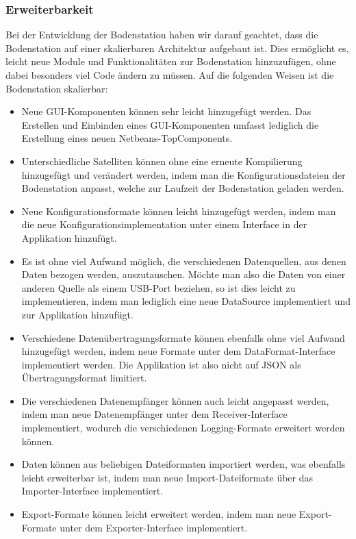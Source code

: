 \subsubsection{Erweiterbarkeit}
Bei der Entwicklung der Bodenstation haben wir darauf geachtet, dass die Bodenstation auf einer skalierbaren Architektur aufgebaut ist. Dies ermöglicht es, leicht neue Module und Funktionalitäten zur Bodenstation hinzuzufügen, ohne dabei besonders viel Code ändern zu müssen. Auf die folgenden Weisen ist die Bodenstation skalierbar:
\begin{itemize}
	\item Neue GUI-Komponenten können sehr leicht hinzugefügt werden. Das Erstellen und Einbinden eines GUI-Komponenten umfasst lediglich die Erstellung eines neuen Netbeans-TopComponents.
	\item Unterschiedliche Satelliten können ohne eine erneute Kompilierung hinzugefügt und verändert werden, indem man die Konfigurationsdateien der Bodenstation anpasst, welche zur Laufzeit der Bodenstation geladen werden.
	\item Neue Konfigurationsformate können leicht hinzugefügt werden, indem man die neue Konfigurationsimplementation unter einem Interface in der Applikation hinzufügt.
	\item Es ist ohne viel Aufwand möglich, die verschiedenen Datenquellen, aus denen Daten bezogen werden, auszutauschen. Möchte man also die Daten von einer anderen Quelle als einem USB-Port beziehen, so ist dies leicht zu implementieren, indem man lediglich eine neue DataSource implementiert und zur Applikation hinzufügt.
	\item Verschiedene Datenübertragungsformate können ebenfalls ohne viel Aufwand hinzugefügt werden, indem neue Formate unter dem DataFormat-Interface implementiert werden. Die Applikation ist also nicht auf JSON als Übertragungsformat limitiert.
	\item Die verschiedenen Datenempfänger können auch leicht angepasst werden, indem man neue Datenempfänger unter dem Receiver-Interface implementiert, wodurch die verschiedenen Logging-Formate erweitert werden können.
	\item Daten können aus beliebigen Dateiformaten importiert werden, was ebenfalls leicht erweiterbar ist, indem man neue Import-Dateiformate über das Importer-Interface implementiert.
	\item Export-Formate können leicht erweitert werden, indem man neue Export-Formate unter dem Exporter-Interface implementiert.
\end{itemize}

